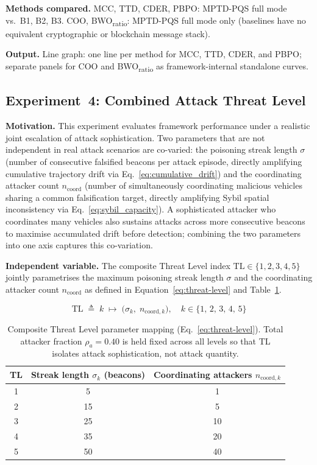 \documentclass[12pt, a4paper]{report}
\begin{document}
\textbf{Methods compared.}
MCC, TTD, CDER, PBPO: MPTD-PQS full mode vs.\ B1, B2, B3.
COO, BWO\textsubscript{ratio}: MPTD-PQS full mode only (baselines
have no equivalent cryptographic or blockchain message stack).

\textbf{Output.}
Line graph: one line per method for MCC, TTD, CDER, and PBPO;
separate panels for COO and BWO\textsubscript{ratio} as
framework-internal standalone curves.

\subsection{Experiment~4: Combined Attack Threat Level}
\label{sec:exp4}

\textbf{Motivation.}
This experiment evaluates framework performance under a realistic
joint escalation of attack sophistication. Two parameters that
are not independent in real attack scenarios are co-varied: the
poisoning streak length $\sigma$ (number of consecutive falsified
beacons per attack episode, directly amplifying cumulative
trajectory drift via Eq.~\ref{eq:cumulative_drift}) and the
coordinating attacker count $n_{\mathrm{coord}}$ (number of
simultaneously coordinating malicious vehicles sharing a common
falsification target, directly amplifying Sybil spatial
inconsistency via Eq.~\ref{eq:sybil_capacity}). A sophisticated
attacker who coordinates many vehicles also sustains attacks
across more consecutive beacons to maximise accumulated drift
before detection; combining the two parameters into one axis
captures this co-variation.

\textbf{Independent variable.}
The composite Threat Level index $\mathrm{TL} \in \{1,2,3,4,5\}$
jointly parametrises the maximum poisoning streak length $\sigma$
and the coordinating attacker count $n_{\mathrm{coord}}$ as
defined in Equation~\ref{eq:threat-level} and
Table~\ref{tab:threat-level}.

\begin{equation}
  \mathrm{TL} \;\triangleq\; k \;\mapsto\;
  \bigl(\sigma_k,\; n_{\mathrm{coord},k}\bigr),
  \quad k \in \{1,\,2,\,3,\,4,\,5\}
  \label{eq:threat-level}
\end{equation}

\begin{table}[H]
\centering
\caption{Composite Threat Level parameter mapping
(Eq.~\ref{eq:threat-level}). Total attacker fraction
$\rho_a = 0.40$ is held fixed across all levels so that TL
isolates attack sophistication, not attack quantity.}
\label{tab:threat-level}
\renewcommand{\arraystretch}{1.15}
\begin{tabular}{|c|c|c|}
\hline
\textbf{TL} &
\textbf{Streak length $\sigma_k$ (beacons)} &
\textbf{Coordinating attackers $n_{\mathrm{coord},k}$} \\
\hline
1 & 5  & 1  \\
\hline
2 & 15 & 5  \\
\hline
3 & 25 & 10 \\
\hline
4 & 35 & 20 \\
\hline
5 & 50 & 40 \\
\hline
\end{tabular}
\end{table}
\end{document}
